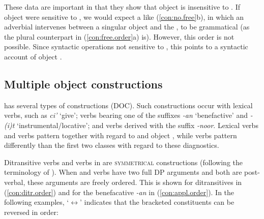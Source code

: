 \documentclass[output=paper,
modfonts
]{langscibook}
\begin{document}
\begin{exe} 
\ex \label{con:free.order}
\begin{xlista}

\end{xlista}
\end{exe}


\noindent These data are important in that they show that object  is insensitive to . If object were sensitive to , we would expect a  like (\ref{con:no.free}b), in which an adverbial intervenes between a singular object  and the , to be grammatical (as the plural counterpart in (\ref{con:free.order}a) is). However, this order is not possible. Since syntactic operations not sensitive to , this points to a syntactic account of object .

\subsection{Multiple object constructions}\label{sec:baier:3.2}

 has several types of  constructions (DOC). Such constructions occur with lexical  verbs, such as \textit{ci'} `give'; verbs bearing one of the  suffixes \textit{-an} `benefactive' and \textit{-(i)t} `instrumental/locative'; and  verbs derived with the  suffix \textit{-noor}. Lexical  verbs and  verbs pattern together with regard to  and object , while  verbs pattern differently than the first two classes with regard to these diagnostics. 
 
Ditransitive verbs and  verbs in  are \textsc{symmetrical}  constructions (following the terminology of ). When  and  verbs have two full DP arguments and both are post-verbal, these arguments are freely ordered. This is shown for ditransitives in (\ref{con:ditr.order}) and for the benefacative  \textit{-an} in (\ref{con:appl.order}). In the following examples, `$\leftrightarrow$' indicates that the bracketed constituents can be reversed in order:
\end{document}
